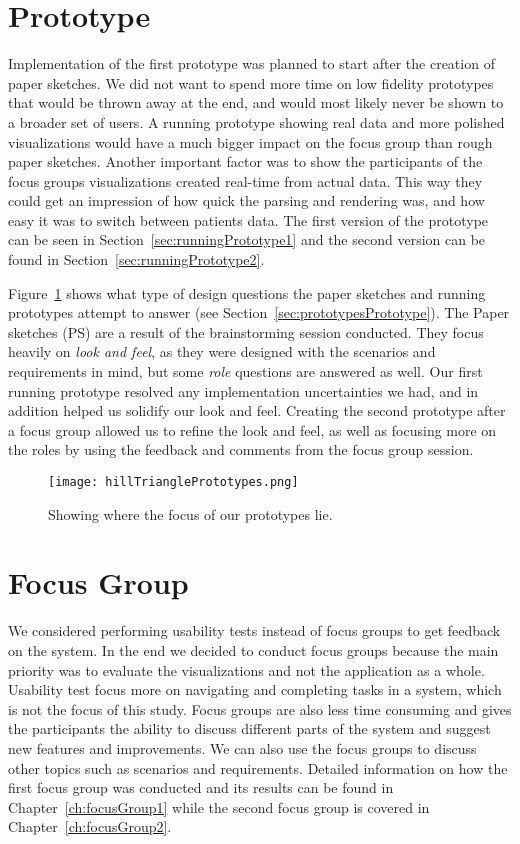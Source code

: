 \section{Prototype}
Implementation of the first prototype was planned to start after the creation of paper sketches. We did not want to spend more time on low fidelity prototypes that would be thrown away at the end, and would most likely never be shown to a broader set of users. A running prototype showing real data and more polished visualizations would have a much bigger impact on the focus group than rough paper sketches. Another important factor was to show the participants of the focus groups visualizations created real-time from actual data. This way they could get an impression of how quick the parsing and rendering was, and how easy it was to switch between patients data. The first version of the prototype can be seen in Section~\ref{sec:runningPrototype1} and the second version can be found in Section~\ref{sec:runningPrototype2}.

Figure~\ref{fig:hillTrianglePrototypex} shows what type of design questions the paper sketches and running prototypes attempt to answer (see Section~\ref{sec:prototypesPrototype}). The Paper sketches (PS) are a result of the brainstorming session conducted. They focus heavily on \textit{look and feel}, as they were designed with the scenarios and requirements in mind, but some \textit{role} questions are answered as well. Our first running prototype resolved any implementation uncertainties we had, and in addition helped us solidify our look and feel. Creating the second prototype after a focus group allowed us to refine the look and feel, as well as focusing more on the roles by using the feedback and comments from the focus group session.

\begin{figure}[h!]
	\centering
		\texttt{[image: hillTrianglePrototypes.png]}
		\caption[Prototype focus]{Showing where the focus of our prototypes lie.}
		\label{fig:hillTrianglePrototypex}
\end{figure}

\section{Focus Group}
We considered performing usability tests instead of focus groups to get feedback on the system. In the end we decided to conduct focus groups because the main priority was to evaluate the visualizations and not the application as a whole. Usability test focus more on navigating and completing tasks in a system, which is not the focus of this study. Focus groups are also less time consuming and gives the participants the ability to discuss different parts of the system and suggest new features and improvements. We can also use the focus groups to discuss other topics such as scenarios and requirements. Detailed information on how the first focus group was conducted and its results can be found in Chapter~\ref{ch:focusGroup1} while the second focus group is covered in Chapter~\ref{ch:focusGroup2}.

